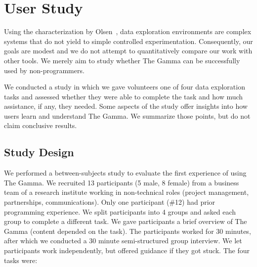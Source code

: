 \documentclass[manuscript,review,anonymous]{acmart}
\begin{document}
\section{User Study}
\label{sec:study}

Using the characterization by Olsen~\cite{evaluating}, data exploration environments are complex
systems that do not yield to simple controlled experimentation. Consequently, our goals are modest and
we do not attempt to quantitatively compare our work with other tools. We merely aim to study whether
The Gamma can be successfully used by non-programmers.

We conducted a study in which we gave volunteers one of four data exploration tasks and assessed
whether they were able to complete the task and how much assistance, if any, they needed.
Some aspects of the study offer insights into how users learn and understand The Gamma. We summarize
those points, but do not claim conclusive results.

\subsection{Study Design}

We performed a between-subjects study to evaluate the first experience of using The Gamma.
We recruited 13 participants (5 male, 8 female) from a business team
of a research institute working in non-technical roles (project management,
partnerships, communications). Only one participant (\#12) had prior programming experience.
We split participants into 4 groups and asked each group to complete a different task.
We gave participants a brief overview of The Gamma (content depended on the task).
The participants worked for 30 minutes, after which we conducted
a 30 minute semi-structured group interview. We let participants work independently, but offered
guidance if they got stuck. The four tasks were:
\end{document}
